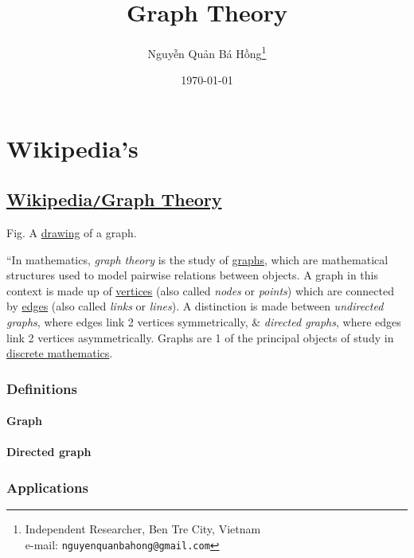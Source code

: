 \documentclass[oneside]{book}
\title{Graph Theory}
\author{\selectlanguage{vietnamese} Nguyễn Quản Bá Hồng\footnote{Independent Researcher, Ben Tre City, Vietnam\\e-mail: \texttt{nguyenquanbahong@gmail.com}}}
\date{\today}
\numberwithin{equation}{section}
\begin{document}
\maketitle
\setcounter{secnumdepth}{4}
\setcounter{tocdepth}{4}
\tableofcontents


\chapter{Wikipedia's}

\section{\href{https://en.wikipedia.org/wiki/Graph_theory}{Wikipedia\texttt{/}Graph Theory}}
\textsf{Fig. A \href{https://en.wikipedia.org/wiki/Graph_drawing}{drawing} of a graph.}

``In mathematics, \textit{graph theory} is the study of \href{https://en.wikipedia.org/wiki/Graph_(discrete_mathematics)}{graphs}, which are mathematical structures used to model pairwise relations between objects. A graph in this context is made up of \href{https://en.wikipedia.org/wiki/Vertex_(graph_theory)}{vertices} (also called \textit{nodes} or \textit{points}) which are connected by \href{https://en.wikipedia.org/wiki/Glossary_of_graph_theory_terms#edge}{edges} (also called \textit{links} or \textit{lines}). A distinction is made between \textit{undirected graphs}, where edges link 2 vertices symmetrically, \& \textit{directed graphs}, where edges link 2 vertices asymmetrically. Graphs are 1 of the principal objects of study in \href{https://en.wikipedia.org/wiki/Discrete_mathematics}{discrete mathematics}.

\subsection{Definitions}

\subsubsection{Graph}

\subsubsection{Directed graph}

\subsection{Applications}
\end{document}
